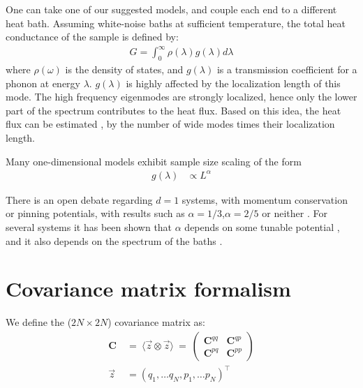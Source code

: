 One can take one of our suggested models, and couple each end to a different heat bath.
Assuming white-noise baths at sufficient temperature, the total heat conductance of the sample is defined by:
\begin{align}
G = \int_0^\infty \rho(\lambda) g(\lambda) d\lambda
\end{align}
where $\rho(\omega)$ is the density of states, and $g(\lambda)$ is 
a transmission coefficient for a phonon at energy $\lambda$.
$g(\lambda)$ is highly affected by the localization length of this mode\cite{tong_wave_1999}.
The high frequency eigenmodes are strongly localized, hence only the
lower part of the spectrum contributes to the heat flux. Based on this idea,
the heat flux can be estimated \cite{lepri_thermal_2001,lepri_thermal_2003,bodyfelt_unpub},
by the number of wide modes times their localization length.

 
Many one-dimensional models 
\cite{narayan_anomalous_2002,dhar_heat_2001,lepri_anomalous_1998,savin_heat_2002} 
exhibit sample size scaling of the form
%
\begin{align}
g(\lambda)    &\propto L^\alpha
\end{align}

There is an open debate regarding $d=1$ systems,
with momentum conservation or pinning potentials, 
with results such as $\alpha=1/3$,$\alpha=2/5$ or neither
\cite{narayan_anomalous_2002,delfini_comment_2008,dhar_dhar_2008,wang_power-law_2011,basile_momentum_2006}.
For several systems it has been shown that $\alpha$ depends on some tunable potential \cite{tong_wave_1999},
and it also depends on the spectrum of the baths \cite{dhar_heat_2001}.




\section{Covariance matrix formalism}

We define the ($2N\times 2N$) covariance matrix as:
\begin{align}
\mathbf{C} \ &=\ \langle \vec{z}\otimes \vec{z}\rangle \ =\ 
              \begin{pmatrix} 
                \mathbf{C}^{qq} & \mathbf{C}^{qp} \\
                \mathbf{C}^{pq} & \mathbf{C}^{pp}
            \end{pmatrix}
\\
\vec{z} &= (q_1,\ldots q_N, p_1,\ldots p_N)^\intercal
\end{align}



